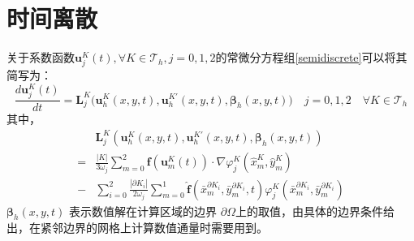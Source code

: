 \documentclass[a4paper, 12pt, UTF8]{ctexart}
\newcommand{\bs}[1]{\boldsymbol{#1}}
\begin{document}
\newpage

\section{时间离散}
关于系数函数$\bs u_{j}^K(t), \forall K\in\mathcal T_h, j=0, 1, 2$的常微分方程组\eqref{semidiscrete}可以将其简写为：
\begin{equation}\label{semidiscretescheme}
\frac{d \bs u_{j}^K(t)}{d t}=\bs L_{j}^K\big(\bs{u}_{h}^K(x, y, t), \bs{u}_{h}^{K'}(x, y, t), \bs{\beta}_{h}(x, y, t)\big) \quad j=0,1,2 \quad \forall K\in\mathcal T_h
\end{equation}
其中，
\begin{equation}
\begin{split}
&\bs L_{j}^K\left(\bs u_{h}^{K}(x, y, t), \bs u_{h}^{K'}(x, y, t),\bs{\beta}_{h}(x, y, t)\right)\\
= &\frac{|K|}{3\omega_j}\sum_{m=0}^{2}  \bs f\left(\bs{u}^{K}_{m}(t)\right) \cdot \nabla \varphi_{j}^K\left(\hat{x}_{m}^K, \hat{y}_{m}^K\right)\\
- &\sum_{i=0}^{2}\frac{\left|\partial K_{i}\right| }{2\omega_j}\sum_{m=0}^{1} \hat{\bs f}\left(\bar{x}_{m}^{\partial K_i}, \bar{y}_{m}^{\partial K_i}, t\right)\varphi_{j}^K\left(\bar{x}_{m}^{\partial K_i}, \bar{y}_{m}^{\partial K_i}\right)
\end{split}
\end{equation}
$\bs{\beta}_{h}(x, y, t)$ 表示数值解在计算区域的边界 $\partial \Omega$上的取值，由具体的边界条件给出，在紧邻边界的网格上计算数值通量时需要用到。
\end{document}
